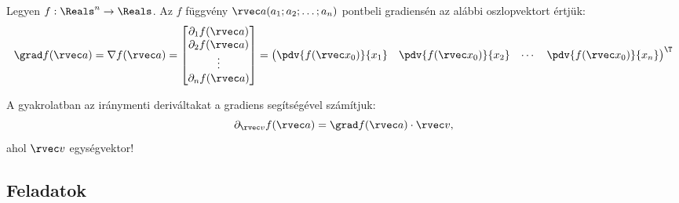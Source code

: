 \documentclass[a4paper, 12pt, fleqn]{scrartcl}
\begin{document}
\begin{definition}[Gradiens]
  Legyen $f: \Reals^n \to \Reals$. Az $f$ függvény
  $\rvec a(a_{1}; a_{2}; \ldots; a_{n})$ pontbeli gradiensén az alábbi
  oszlopvektort értjük:
  \def\arraystretch{1.5}
  $$
    \grad f(\rvec a) = \nabla f(\rvec a) = \begin{bmatrix}
      \partial_1 f(\rvec a) \\
      \partial_2 f(\rvec a) \\
      \vdots                \\
      \partial_n f(\rvec a)
    \end{bmatrix} = \begin{pmatrix}
      \displaystyle\pdv{f(\rvec x_0)}{x_1} &
      \displaystyle\pdv{f(\rvec x_0)}{x_2} &
      \cdots                               &
      \displaystyle\pdv{f(\rvec x_0)}{x_n}
    \end{pmatrix}^\T
  $$
\end{definition}

\begin{note}
  A gyakrolatban az iránymenti deriváltakat a gradiens segítségével számítjuk:
  $$
    \partial_{\rvec v} f(\rvec a) = \grad f(\rvec a) \cdot \rvec v
    \text,
  $$
  ahol $\rvec v$ egységvektor!
\end{note}

\clearpage
\subsection{Feladatok}
\end{document}
